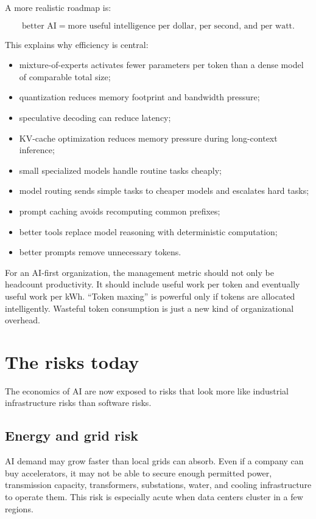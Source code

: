 A more realistic roadmap is:

\[
\text{better AI} = \text{more useful intelligence per dollar, per second, and per watt}.
\]

This explains why efficiency is central:

\begin{itemize}[leftmargin=*]
  \item mixture-of-experts activates fewer parameters per token than a dense model of comparable total size;
  \item quantization reduces memory footprint and bandwidth pressure;
  \item speculative decoding can reduce latency;
  \item KV-cache optimization reduces memory pressure during long-context inference;
  \item small specialized models handle routine tasks cheaply;
  \item model routing sends simple tasks to cheaper models and escalates hard tasks;
  \item prompt caching avoids recomputing common prefixes;
  \item better tools replace model reasoning with deterministic computation;
  \item better prompts remove unnecessary tokens.
\end{itemize}

For an AI-first organization, the management metric should not only be headcount productivity. It should include useful work per token and eventually useful work per kWh. ``Token maxing'' is powerful only if tokens are allocated intelligently. Wasteful token consumption is just a new kind of organizational overhead.

\section{The risks today}

The economics of AI are now exposed to risks that look more like industrial infrastructure risks than software risks.

\subsection{Energy and grid risk}

AI demand may grow faster than local grids can absorb. Even if a company can buy accelerators, it may not be able to secure enough permitted power, transmission capacity, transformers, substations, water, and cooling infrastructure to operate them. This risk is especially acute when data centers cluster in a few regions.

